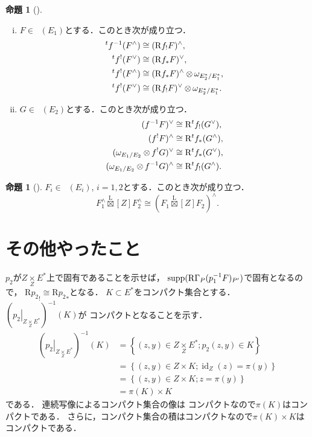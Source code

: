 \documentclass[leqno, 10pt, a4paper, dvipdfmx]{jsarticle}
\makeatletter
\theoremstyle{definition}
\newcommand{\rr}{\mathbf{R}}
\renewenvironment{proof}[1][\proofname]{\par
  \pushQED{\qed}%
  \normalfont \topsep6\p@\@plus6\p@\relax
  \trivlist
  \item[\hskip\labelsep
         \bfseries
    {#1}]\ignorespaces
}{%
  \popQED\endtrivlist\@endpefalse
}
\renewcommand{\proofname}{証明.}
\numberwithin{equation}{section}
\newcommand{\id}{\mathop{\mathrm{id}}\nolimits}
\newcommand{\supp}{\mathop{\mathrm{supp}}\nolimits}
\newcommand{\RG}{\mathop{\mathrm{R}\hspace{-0pt}\Gamma}\nolimits}
\newcommand{\Rder}{\mathrm{R}}
\newcommand{\tens}[1][]{\mathbin{\otimes_{\raise1.5ex\hbox to-.1em{}{#1}}}}
\newcommand{\etens}{\mathbin{\boxtimes}}
\newcommand{\letens}{\overset{\mathrm{L}}{\etens}}
\newcommand{\mres}[2][]{{\left.{#1}\right\rvert}_{#2}}
\newcommand{\pb}[1][]{\mathbin{\mathop{\times}\limits_{#1}}}
\theoremstyle{mystyle}
\newtheorem{PRP}[AXM]{命題}
\newcommand{\Dlcon}{\mathop{\mathsf{D}^{+}_{\rr_{>0}}}\nolimits}
\makeatother
\begin{document}
\begin{PRP}[{\cite[Proposition 3.7.14]{KS90}}]
    \begin{enumerate}[(i)]
        \item \(F\in\Dlcon(E_1)\)とする．このとき次が成り立つ．
        \begin{align*}
            {}^tf^{-1}(F^\wedge)&\cong (\Rder{f}_!F)^\wedge,\\
            {}^tf^{!}(F^\vee)&\cong (\Rder{f}_\ast F)^\vee,\\
            {}^tf^{!}(F^\wedge)&\cong (\Rder{f}_{\ast}F)^\wedge\tens\omega_{E_2^\ast/E_1^\ast},\\
            {}^tf^{!}(F^\vee)&\cong (\Rder{f}_{!}F)^\vee\tens\omega_{E_2^\ast/E_1^\ast}.
        \end{align*}
        \item \(G\in\Dlcon(E_2)\)とする．このとき次が成り立つ．
        \begin{align*}
            (f^{-1}F)^\vee&\cong \Rder^t{f}_!(G^\vee),\\
            (f^{!}F)^\wedge&\cong \Rder^t{f}_\ast(G^\wedge),\\
            (\omega_{E_1/E_2}\tens f^!G)^\vee&\cong \Rder^t{f}_\ast(G^\vee),\\
            (\omega_{E_1/E_2}\tens f^{-1}G)^\wedge&\cong \Rder^t{f}_!(G^\wedge).
        \end{align*}
    \end{enumerate}
\end{PRP}
\begin{PRP}[{\cite[Proposition 3.7.15]{KS90}}]
    \(F_i\in\Dlcon(E_i)\), \(i=1,2\)とする．このとき次が成り立つ．
    \[
        F_1^\wedge\letens[Z]F_2^\wedge
        \cong
        \left(F_1\letens[Z]F_2\right)^\wedge.
    \]
\end{PRP}

\section{その他やったこと}
\begin{proof}[\textbf{\eqref{377-proper}の部分の証明．}]
    \(p_2\)が\(Z\pb[Z]E^{\ast}\)上で固有であることを示せば，
    \(\supp(\RG_{P}(p_1^{-1}F)_{P'})\)で固有となるので，
    \(\Rder{p_2}_!\cong\Rder{p_2}_{\ast}\)となる．
    \(K\subset E^{\ast}\)をコンパクト集合とする．
    \((\mres[p_2]{Z\pb[Z]E^{\ast}})^{-1}(K)\)が
    コンパクトとなることを示す．
    \begin{align*}
        (\mres[p_2]{Z\pb[Z]E^{\ast}})^{-1}(K)
        &=\left\{
            (z,y)\in Z\pb[Z]E^{\ast};
            p_2(z,y)\in K
        \right\}\\
        &=\left\{
            (z,y)\in Z\times K;\id_Z(z)=\pi(y)
        \right\}\\
        &=\left\{
            (z,y)\in Z\times K;z=\pi(y)
        \right\}\\
        &=\pi(K)\times K
    \end{align*}
    である．
    連続写像によるコンパクト集合の像は
    コンパクトなので\(\pi(K)\)はコンパクトである．
    さらに，コンパクト集合の積はコンパクトなので\(\pi(K)\times K\)は
    コンパクトである．
\end{proof}
\end{document}
